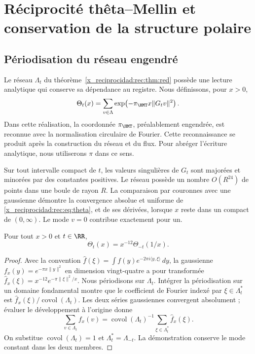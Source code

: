 \chapter{Réciprocité thêta--Mellin et conservation de la structure polaire}
\label{x_reciprocidad:rec:espectral}

\section{Périodisation du réseau engendré}

Le réseau \(\Lambda_t\) du théorème~\ref{x_reciprocidad:rec:thm:red} possède une lecture analytique qui conserve sa dépendance au registre. Nous définissons, pour \(x>0\),
\begin{equation}
 \Theta_t(x)=\sum_{v\in\Lambda}
       \exp\!\left(-\pi_{\HMT}x\|G_tv\|^2\right).
 \label{x_reciprocidad:rec:eq:theta}
\end{equation}
Dans cette réalisation, la coordonnée \(\pi_{\HMT}\), préalablement engendrée, est reconnue avec la normalisation circulaire de Fourier. Cette reconnaissance se produit après la construction du réseau et du flux. Pour abréger l’écriture analytique, nous utiliserons \(\pi\) dans ce sens.

Sur tout intervalle compact de \(t\), les valeurs singulières de \(G_t\) sont majorées et minorées par des constantes positives. Le réseau possède un nombre \(O(R^{24})\) de points dans une boule de rayon \(R\). La comparaison par couronnes avec une gaussienne démontre la convergence absolue et uniforme de \eqref{x_reciprocidad:rec:eq:theta}, et de ses dérivées, lorsque \(x\) reste dans un compact de \((0,\infty)\). Le mode \(v=0\) contribue exactement pour un.

\begin{theorem}
\label{x_reciprocidad:rec:thm:theta}
Pour tout \(x>0\) et \(t\in\RR\),
\begin{equation}
 \Theta_t(x)=x^{-12}\Theta_{-t}(1/x).
 \label{x_reciprocidad:rec:eq:theta-reciproca}
\end{equation}
\end{theorem}
\begin{proof}
Avec la convention \(\widehat f(\xi)=\int f(y)e^{-2\pi i\langle y,\xi\rangle}\,dy\), la gaussienne \(f_x(y)=e^{-\pi x\|y\|^2}\) en dimension vingt-quatre a pour transformée \(\widehat f_x(\xi)=x^{-12}e^{-\pi\|\xi\|^2/x}\). Nous périodisons sur \(\Lambda_t\). Intégrer la périodisation sur un domaine fondamental montre que le coefficient de Fourier indexé par \(\xi\in\Lambda_t^*\) est \(\widehat f_x(\xi)/\operatorname{covol}(\Lambda_t)\). Les deux séries gaussiennes convergent absolument ; évaluer le développement à l'origine donne
\[
 \sum_{v\in\Lambda_t}f_x(v)
 =\operatorname{covol}(\Lambda_t)^{-1}
   \sum_{\xi\in\Lambda_t^*}\widehat f_x(\xi).
\]
On substitue \(\operatorname{covol}(\Lambda_t)=1\) et \(\Lambda_t^*=\Lambda_{-t}\). La démonstration conserve le mode constant dans les deux membres.
\end{proof}

